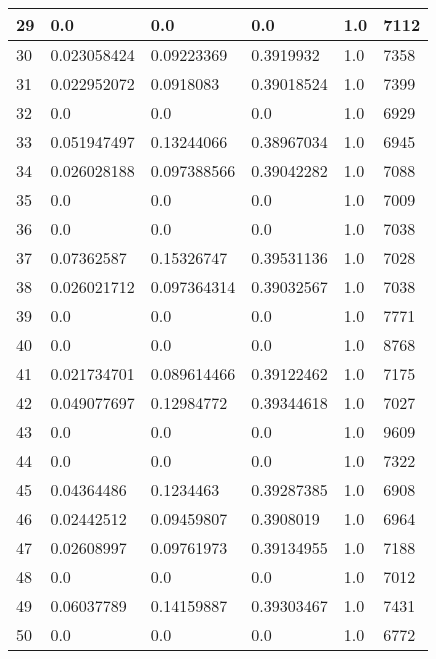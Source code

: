 \begin{longtable}{|l|l|l|l|l|l|}
29 & 0.0 & 0.0 & 0.0 & 1.0 & 7112 \\ \hline 
30 & 0.023058424 & 0.09223369 & 0.3919932 & 1.0 & 7358 \\ \hline 
31 & 0.022952072 & 0.0918083 & 0.39018524 & 1.0 & 7399 \\ \hline 
32 & 0.0 & 0.0 & 0.0 & 1.0 & 6929 \\ \hline 
33 & 0.051947497 & 0.13244066 & 0.38967034 & 1.0 & 6945 \\ \hline 
34 & 0.026028188 & 0.097388566 & 0.39042282 & 1.0 & 7088 \\ \hline 
35 & 0.0 & 0.0 & 0.0 & 1.0 & 7009 \\ \hline 
36 & 0.0 & 0.0 & 0.0 & 1.0 & 7038 \\ \hline 
37 & 0.07362587 & 0.15326747 & 0.39531136 & 1.0 & 7028 \\ \hline 
38 & 0.026021712 & 0.097364314 & 0.39032567 & 1.0 & 7038 \\ \hline 
39 & 0.0 & 0.0 & 0.0 & 1.0 & 7771 \\ \hline 
40 & 0.0 & 0.0 & 0.0 & 1.0 & 8768 \\ \hline 
41 & 0.021734701 & 0.089614466 & 0.39122462 & 1.0 & 7175 \\ \hline 
42 & 0.049077697 & 0.12984772 & 0.39344618 & 1.0 & 7027 \\ \hline 
43 & 0.0 & 0.0 & 0.0 & 1.0 & 9609 \\ \hline 
44 & 0.0 & 0.0 & 0.0 & 1.0 & 7322 \\ \hline 
45 & 0.04364486 & 0.1234463 & 0.39287385 & 1.0 & 6908 \\ \hline 
46 & 0.02442512 & 0.09459807 & 0.3908019 & 1.0 & 6964 \\ \hline 
47 & 0.02608997 & 0.09761973 & 0.39134955 & 1.0 & 7188 \\ \hline 
48 & 0.0 & 0.0 & 0.0 & 1.0 & 7012 \\ \hline 
49 & 0.06037789 & 0.14159887 & 0.39303467 & 1.0 & 7431 \\ \hline 
50 & 0.0 & 0.0 & 0.0 & 1.0 & 6772 \\ \hline 
\end{longtable}